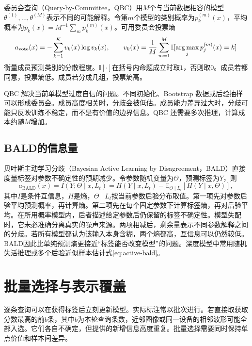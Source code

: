 委员会查询（Query-by-Committee，QBC）用$M$个与当前数据相容的模型$\theta^{(1)},\ldots,\theta^{(M)}$表示不同的可能解释。令第$m$个模型的类别概率为$p_k^{(m)}(x)$，平均概率为$\bar p_k(x)=M^{-1}\sum_m p_k^{(m)}(x)$。可用委员会投票熵
\begin{equation}
 a_{\mathrm{vote}}(x)=-\sum_{k=1}^{K}v_k(x)\log v_k(x),
 \qquad v_k(x)=\frac1M\sum_{m=1}^{M}\mathbb I[\mathop{\mathrm{arg\,max}}_jp_j^{(m)}(x)=k]
 \label{eq:active-qbc}
\end{equation}
衡量成员预测类别的分散程度。$\mathbb I[\cdot]$在括号内命题成立时取$1$，否则取$0$。成员若都同意，投票熵低。成员若分成几组，投票熵高。

QBC 解决当前单模型过度自信的问题。不同初始化、Bootstrap 数据或后验抽样可以形成委员会。成员高度相关时，分歧会被低估。成员能力差异过大时，分歧可能只反映训练不稳定，而不是有价值的边界信息。QBC 还需要多次推理，计算成本约随$M$增加。

\subsection{BALD的信息量}

贝叶斯主动学习分歧（Bayesian Active Learning by Disagreement，BALD）直接度量标签对参数不确定性的预期减少。令参数随机变量为$\Theta$，预测标签为$Y$，则
\begin{equation}
 a_{\mathrm{BALD}}(x)=I(Y;\Theta\mid x,L_t)
 =H(Y\mid x,L_t)-\mathbb E_{\Theta\mid L_t}[H(Y\mid x,\Theta)],
 \label{eq:active-bald}
\end{equation}
其中$I$是条件互信息，$H$是熵，$\Theta\mid L_t$按当前参数后验分布取值。第一项先对参数后验平均预测概率，再计算熵。第二项先在每个固定参数下计算标签熵，再对后验平均。在所用概率模型内，后者描述给定参数后仍保留的标签不确定性。模型失配时，它未必准确分离真实的噪声来源。两项相减后，剩余量表示不同参数解释之间的分歧。若所有模型都认为该输入本身含糊，两个熵都高，互信息可以仍然较低。BALD因此比单纯预测熵更接近“标签能否改变模型”的问题。深度模型中常用随机失活推理或多个后验近似样本估计式\eqref{eq:active-bald}\cite{houlsby2011bald,gal2017deepactive}。

\section{批量选择与表示覆盖}

逐条查询可以在获得标签后立刻更新模型。实际标注常以批次进行。若直接取获取分数最高的前$b$条，其中$b$为本轮查询条数，近邻图像或同一设备的相邻波形可能全部入选。它们各自不确定，但提供的新增信息高度重复。批量选择需要同时保持单点价值和样本间差异。

